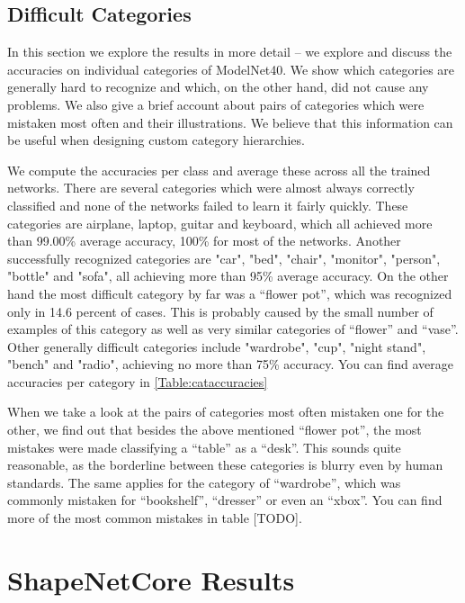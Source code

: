 \subsection{Difficult Categories}
In this section we explore the results in more detail -- we explore and discuss the accuracies on individual categories of ModelNet40. We show which categories are generally hard to recognize and which, on the other hand, did not cause any problems. We also give a brief account about pairs of categories which were mistaken most often and their illustrations. We believe that this information can be useful when designing custom category hierarchies. \par
We compute the accuracies per class and average these across all the trained networks. There are several categories which were almost always correctly classified and none of the networks failed to learn it fairly quickly. These categories are airplane, laptop, guitar and keyboard, which all achieved more than 99.00\% average accuracy, 100\% for most of the networks. Another successfully recognized categories are "car", "bed", "chair", "monitor", "person", "bottle" and "sofa", all achieving more than 95\% average accuracy.  
On the other hand the most difficult category by far was a “flower pot”, which was recognized only in 14.6 percent of cases. This is probably caused by the small number of examples of this category as well as very similar categories of “flower” and “vase”. Other generally difficult categories include "wardrobe", "cup", "night stand", "bench" and "radio", achieving no more than 75\% accuracy. You can find average accuracies per category in \autoref{Table:cataccuracies} \par
When we take a look at the pairs of categories most often mistaken one for the other, we find out that besides the above mentioned “flower pot”, the most mistakes were made classifying a “table” as a “desk”. This sounds quite reasonable, as the borderline between these categories is blurry even by human standards. The same applies for the category of “wardrobe”, which was commonly mistaken for “bookshelf”, “dresser” or even an “xbox”. You can find more of the most common mistakes in table [TODO].




\section{ShapeNetCore Results}






